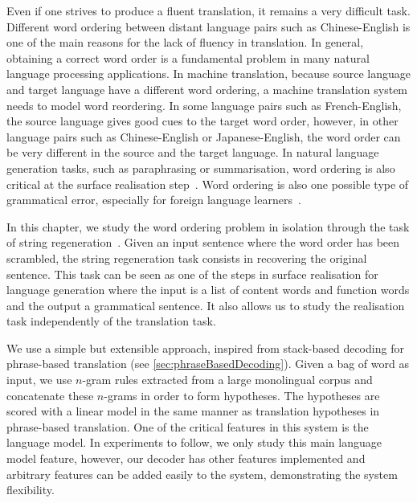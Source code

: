 Even if one strives to produce a fluent translation, it remains a very difficult task.
Different word ordering between distant language pairs such as
Chinese-English is one of the main reasons for the lack of fluency in translation.
In general, obtaining a correct word order is a fundamental problem in many natural language
processing applications.
In machine translation, because
source language and target language have a different word
ordering, a machine translation system needs to model word
reordering. In some language pairs such as French-English, the
source language gives good cues to the target word order, however,
in other language pairs such as Chinese-English or Japanese-English,
the word order can be very different in the source and
the target language. In natural language generation tasks, such
as paraphrasing or summarisation, word ordering
is also critical at the surface realisation
step~\citep{reiter-dale:1997:JNLE}.
Word ordering is also one possible type of grammatical
error, especially for foreign language
learners~\citep{yu-chen:2012:COLING}. %

In this chapter, we study the word ordering problem in
isolation through the task of
string regeneration~\citep{wan-dras-dale-paris:2009:EACL}.
Given an input sentence where the word order has
been scrambled, the string regeneration task consists in recovering
the original sentence. This task can be seen as one of the
steps in surface realisation for language generation where
the input is a list of content words and function words and
the output a grammatical sentence. It also allows us to study
the realisation task independently of the translation task.

We use a simple but extensible approach, inspired from
stack-based decoding for phrase-based
translation (see \autoref{sec:phraseBasedDecoding}).
Given a bag of word as input, we use $n$-gram rules
extracted from a large monolingual corpus and concatenate
these $n$-grams in order to form hypotheses. The hypotheses are scored
with a linear model in the same manner as translation
hypotheses in phrase-based translation.
One of the critical features in this system
is the language model. In experiments to follow, we only study
this main language model feature, however, our decoder has other features
implemented and
arbitrary features can be added easily to the
system, demonstrating the system flexibility.

